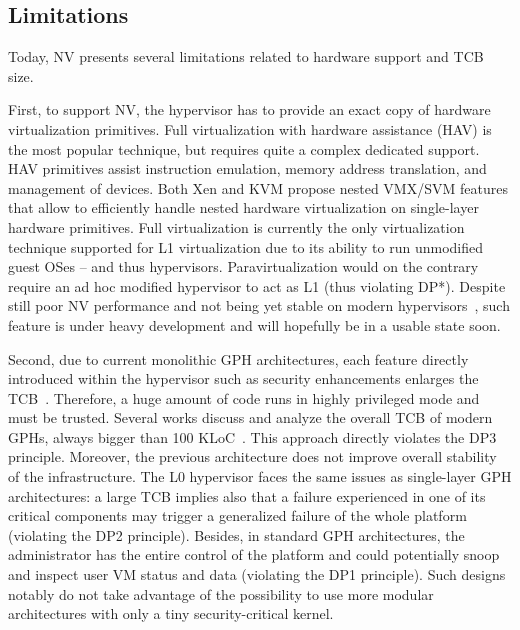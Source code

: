 \documentclass{sig-alternate}
\begin{document}
\subsection{Limitations}

\noindent Today, NV presents several limitations related to hardware support and TCB size. 

First, to support NV, the hypervisor has to provide an exact copy of hardware virtualization primitives. Full virtualization with hardware assistance (HAV) is the most popular technique, but requires quite a complex dedicated support.
HAV primitives assist instruction emulation, memory address translation, and management of devices. Both Xen and KVM propose nested VMX/SVM features that allow to efficiently handle nested hardware virtualization on single-layer hardware primitives.
Full virtualization is currently the only virtualization technique supported for L1 virtualization due to its ability to run unmodified guest OSes -- and thus hypervisors. Paravirtualization would on the contrary require an ad hoc modified hypervisor to act as L1 (thus violating DP*).
Despite still poor NV performance and not being yet stable on modern hypervisors~\cite{xen:test}, such feature is under heavy development and will hopefully be in a usable state soon.

Second, due to current monolithic GPH architectures, each feature directly introduced within the hypervisor such as security enhancements enlarges the TCB~\cite{cloudvisor:zhang}. Therefore, a huge amount of code runs in highly privileged mode and must be trusted. Several works discuss and analyze the overall TCB of modern GPHs, always bigger than 100 KLoC~\cite{nova, xmhf}. This approach directly violates the DP3 principle.
Moreover, the previous architecture does not improve overall stability of the infrastructure. The L0 hypervisor faces the same issues as single-layer GPH architectures: a large TCB implies also that a failure experienced in one of its critical components may trigger a generalized failure of the whole platform (violating the DP2 principle). Besides, in standard GPH architectures, the administrator has the entire control of the platform and could potentially snoop and inspect user VM status and data (violating the DP1 principle).
Such designs notably do not take advantage of the possibility  to use more modular architectures with only a tiny security-critical kernel.
\end{document}
